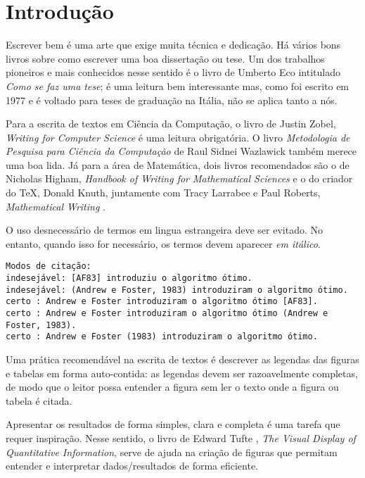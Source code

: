 \chapter{Introdução}
\label{cap:introducao}

Escrever bem é uma arte que exige muita técnica e dedicação. Há vários bons livros
sobre como escrever uma boa dissertação ou tese. Um dos trabalhos pioneiros e mais
conhecidos nesse sentido é o livro de Umberto Eco \cite{eco:09} intitulado 
\emph{Como se faz uma tese}; é uma leitura bem interessante mas, como foi escrito 
em 1977 e é voltado para teses de graduação na Itália, não se aplica tanto a nós.

Para a escrita de textos em Ciência da Computação, o livro de Justin Zobel, 
\emph{Writing for Computer Science} \cite{zobel:04} é uma leitura obrigatória. 
O livro \emph{Metodologia de Pesquisa para Ciência da Computação} de 
Raul Sidnei Wazlawick \cite{waz:09} também merece uma boa lida.
Já para a área de Matemática, dois livros recomendados são o de Nicholas Higham,
\emph{Handbook of Writing for Mathematical Sciences} \cite{Higham:98} e o do criador
do \TeX, Donald Knuth, juntamente com Tracy Larrabee e Paul Roberts, 
\emph{Mathematical Writing} \cite{Knuth:96}.

O uso desnecessário de termos em lingua estrangeira deve ser evitado. No entanto,
quando isso for necessário, os termos devem aparecer \emph{em itálico}.

\begin{small}
\begin{verbatim}
Modos de citação:
indesejável: [AF83] introduziu o algoritmo ótimo.
indesejável: (Andrew e Foster, 1983) introduziram o algoritmo ótimo.
certo : Andrew e Foster introduziram o algoritmo ótimo [AF83].
certo : Andrew e Foster introduziram o algoritmo ótimo (Andrew e Foster, 1983).
certo : Andrew e Foster (1983) introduziram o algoritmo ótimo.
\end{verbatim}
\end{small}

Uma prática recomendável na escrita de textos é descrever as legendas das
figuras e tabelas em forma auto-contida: as legendas devem ser razoavelmente
completas, de modo que o leitor possa entender a figura sem ler o texto onde a
figura ou tabela é citada.  

Apresentar os resultados de forma simples, clara e completa é uma tarefa que
requer inspiração. Nesse sentido, o livro de Edward Tufte \cite{tufte01:visualDisplay},
\emph{The Visual Display of Quantitative Information}, serve de ajuda na 
criação de figuras que permitam entender e interpretar dados/resultados de forma
eficiente.

